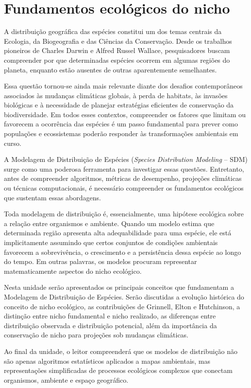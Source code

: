 \chapter{Fundamentos ecológicos do nicho}

\begin{chapteropening}
	
	A distribuição geográfica das espécies constitui um dos temas centrais da Ecologia, da Biogeografia e das Ciências da Conservação. Desde os trabalhos pioneiros de Charles Darwin e Alfred Russel Wallace, pesquisadores buscam compreender por que determinadas espécies ocorrem em algumas regiões do planeta, enquanto estão ausentes de outras aparentemente semelhantes.
	
	Essa questão tornou-se ainda mais relevante diante dos desafios contemporâneos associados às mudanças climáticas globais, à perda de habitats, às invasões biológicas e à necessidade de planejar estratégias eficientes de conservação da biodiversidade. Em todos esses contextos, compreender os fatores que limitam ou favorecem a ocorrência das espécies é um passo fundamental para prever como populações e ecossistemas poderão responder às transformações ambientais em curso.
	
	A Modelagem de Distribuição de Espécies (\textit{Species Distribution Modeling} -- SDM) surge como uma poderosa ferramenta para investigar essas questões. Entretanto, antes de compreender algoritmos, métricas de desempenho, projeções climáticas ou técnicas computacionais, é necessário compreender os fundamentos ecológicos que sustentam essas abordagens.
	
	Toda modelagem de distribuição é, essencialmente, uma hipótese ecológica sobre a relação entre organismos e ambiente. Quando um modelo estima que determinada região apresenta alta adequabilidade para uma espécie, ele está implicitamente assumindo que certos conjuntos de condições ambientais favorecem a sobrevivência, o crescimento e a persistência dessa espécie ao longo do tempo. Em outras palavras, os modelos procuram representar matematicamente aspectos do nicho ecológico.
	
	Nesta unidade serão apresentados os principais conceitos que fundamentam a Modelagem de Distribuição de Espécies. Serão discutidas a evolução histórica do conceito de nicho ecológico, as contribuições de Grinnell, Elton e Hutchinson, a distinção entre nicho fundamental e nicho realizado, as diferenças entre distribuição observada e distribuição potencial, além da importância da conservação de nicho para projeções sob mudanças climáticas.
	
	Ao final da unidade, o leitor compreenderá que os modelos de distribuição não são apenas algoritmos estatísticos aplicados a mapas ambientais, mas representações simplificadas de processos ecológicos complexos que conectam organismos, ambiente e espaço geográfico.
	
\end{chapteropening}

